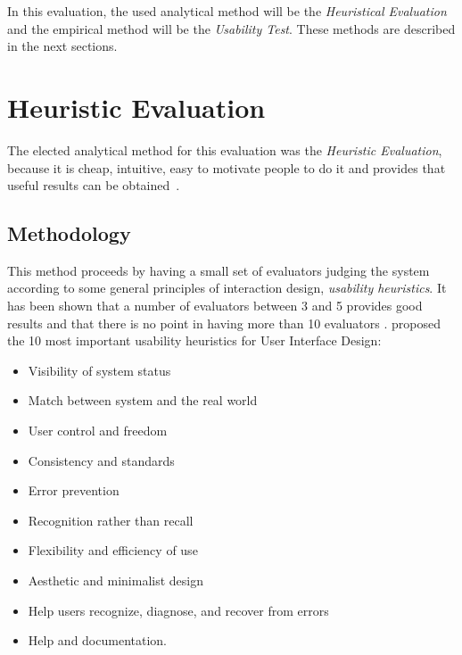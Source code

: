\documentclass[a4paper]{article}
\begin{document}
In this evaluation, the used analytical method will be the \emph{Heuristical Evaluation} and the empirical method will be the \emph{Usability Test}. These methods are described in the next sections.



\section{Heuristic Evaluation}
\label{sec:heuristic}

The elected analytical method for this evaluation was the \emph{Heuristic Evaluation}, because it is cheap, intuitive, easy to motivate people to do it and provides that useful results can be obtained~\citep{nielsen1990heuristic}.

\subsection{Methodology}
This method proceeds by having a small set of evaluators judging the system according to some general principles of interaction design, \emph{usability heuristics}. It has been shown that a number of evaluators between 3 and 5 provides good results and that there is no point in having more than 10 evaluators \citep{nielsen1990heuristic}. \citet{nielsen1995ten} proposed the 10 most important usability heuristics for User Interface Design:

\begin{itemize}
	\item Visibility of system status

	\item Match between system and the real world

	\item User control and freedom

	\item Consistency and standards

	\item Error prevention

	\item Recognition rather than recall

	\item Flexibility and efficiency of use

	\item Aesthetic and minimalist design

	\item Help users recognize, diagnose, and recover from errors

	\item Help and documentation.
\end{itemize}
\end{document}
